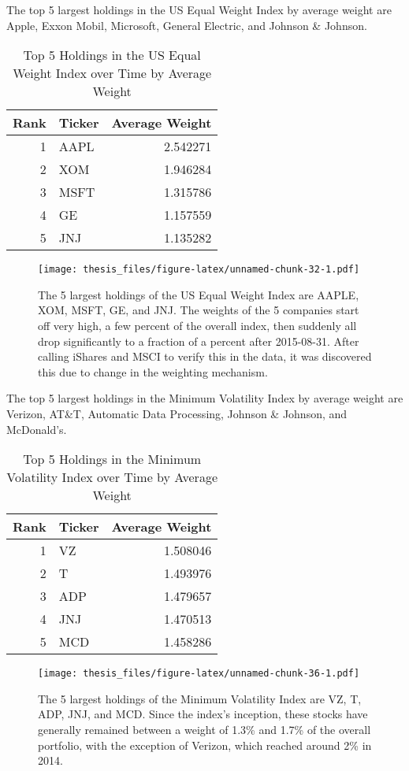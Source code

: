 \documentclass[12pt,twoside]{reedthesis}
\theoremstyle{definition}
\theoremstyle{definition}
\theoremstyle{definition}
\theoremstyle{remark}
\begin{document}
The top 5 largest holdings in the US Equal Weight Index by average
weight are Apple, Exxon Mobil, Microsoft, General Electric, and Johnson
\& Johnson.
\begin{longtable}[t]{rlr}
\caption{\label{tab:unnamed-chunk-30}Top 5 Holdings in the US Equal Weight Index over Time by Average Weight}\\
\toprule
Rank & Ticker & Average Weight\\
\midrule
1 & AAPL & 2.542271\\
2 & XOM & 1.946284\\
3 & MSFT & 1.315786\\
4 & GE & 1.157559\\
5 & JNJ & 1.135282\\
\bottomrule
\end{longtable}
\begin{figure}[htbp]
\centering
\texttt{[image: thesis\_files/figure-latex/unnamed-chunk-32-1.pdf]}
\caption{\label{fig:unnamed-chunk-32}The 5 largest holdings of the US Equal
Weight Index are AAPLE, XOM, MSFT, GE, and JNJ. The weights of the 5
companies start off very high, a few percent of the overall index, then
suddenly all drop significantly to a fraction of a percent after
2015-08-31. After calling iShares and MSCI to verify this in the data,
it was discovered this due to change in the weighting mechanism.}
\end{figure}
The top 5 largest holdings in the Minimum Volatility Index by average
weight are Verizon, AT\&T, Automatic Data Processing, Johnson \&
Johnson, and McDonald's.
\begin{longtable}[t]{rlr}
\caption{\label{tab:unnamed-chunk-34}Top 5 Holdings in the Minimum Volatility Index over Time by Average Weight}\\
\toprule
Rank & Ticker & Average Weight\\
\midrule
1 & VZ & 1.508046\\
2 & T & 1.493976\\
3 & ADP & 1.479657\\
4 & JNJ & 1.470513\\
5 & MCD & 1.458286\\
\bottomrule
\end{longtable}
\begin{figure}[htbp]
\centering
\texttt{[image: thesis\_files/figure-latex/unnamed-chunk-36-1.pdf]}
\caption{\label{fig:unnamed-chunk-36}The 5 largest holdings of the Minimum
Volatility Index are VZ, T, ADP, JNJ, and MCD. Since the index's
inception, these stocks have generally remained between a weight of
1.3\% and 1.7\% of the overall portfolio, with the exception of Verizon,
which reached around 2\% in 2014.}
\end{figure}
\end{document}
